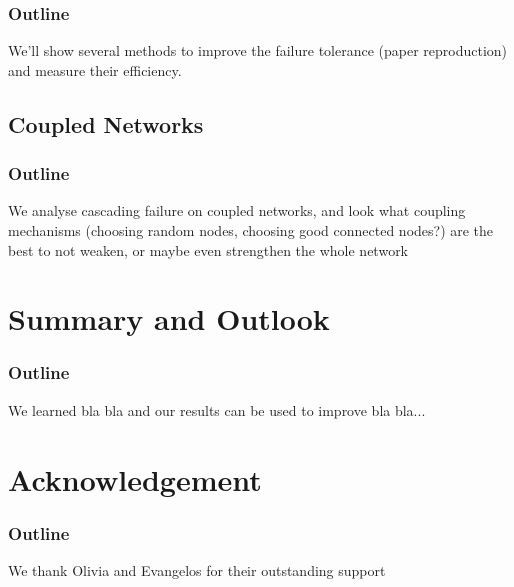 \documentclass[11pt]{article}
\begin{document}
\subsubsection{Outline}
We'll show several methods to improve the failure tolerance (paper reproduction) and measure their efficiency.
\subsection{Coupled Networks}
\subsubsection{Outline}
We analyse cascading failure on coupled networks, and look what coupling mechanisms (choosing random nodes, choosing good connected nodes?) are the best to not weaken, or maybe even strengthen the whole network
\section{Summary and Outlook}
\subsubsection{Outline}
We learned bla bla and our results can be used to improve bla bla...
\section{Acknowledgement}
\subsubsection{Outline}
We thank Olivia and Evangelos for their outstanding support

\nocite{*}


\end{document}
